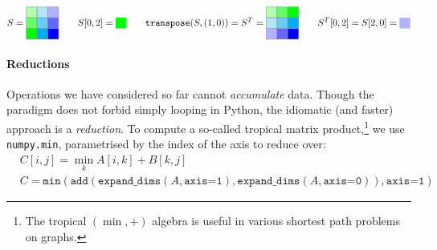 $$
S = \begin{tikzpicture}[baseline=-0.65ex]
    \draw [draw=gray, fill=green] (-0.6, -0.6) rectangle (-0.2, -0.2);
    \draw [draw=gray, fill=green!60] (-0.6, -0.2) rectangle (-0.2, 0.2);
    \draw [draw=gray, fill=green!30] (-0.6, 0.2) rectangle (-0.2, 0.6);
    \draw [draw=gray, fill=cyan] (-0.2, -0.6) rectangle (0.2, -0.2);
    \draw [draw=gray, fill=cyan!60] (-0.2, -0.2) rectangle (0.2, 0.2);
    \draw [draw=gray, fill=cyan!30] (-0.2, 0.2) rectangle (0.2, 0.6);
    \draw [draw=gray, fill=blue] (0.2, -0.6) rectangle (0.6, -0.2);
    \draw [draw=gray, fill=blue!60] (0.2, -0.2) rectangle (0.6, 0.2);
    \draw [draw=gray, fill=blue!30] (0.2, 0.2) rectangle (0.6, 0.6);
\end{tikzpicture} \qquad
S[0, 2] = \begin{tikzpicture}[baseline=-0.65ex]
    \draw [draw=none, fill=green] (-0.2, -0.2) rectangle (0.2, 0.2);
\end{tikzpicture} \qquad 
\texttt{transpose} \left(S, (1, 0) \right)
= S^T = 
\begin{tikzpicture}[baseline=-0.65ex]
    \draw [draw=gray, fill=blue!30] (-0.2, -0.2) rectangle (-0.6, -0.6);
    \draw [draw=gray, fill=cyan!30] (-0.2, 0.2) rectangle (-0.6, -0.2);
    \draw [draw=gray, fill=green!30] (-0.2, 0.6) rectangle (-0.6, 0.2);
    \draw [draw=gray, fill=blue!60] (0.2, -0.2) rectangle (-0.2, -0.6);
    \draw [draw=gray, fill=cyan!60] (0.2, 0.2) rectangle (-0.2, -0.2);
    \draw [draw=gray, fill=green!60] (0.2, 0.6) rectangle (-0.2, 0.2);
    \draw [draw=gray, fill=blue] (0.6, -0.2) rectangle (0.2, -0.6);
    \draw [draw=gray, fill=cyan] (0.6, 0.2) rectangle (0.2, -0.2);
    \draw [draw=gray, fill=green] (0.6, 0.6) rectangle (0.2, 0.2);
\end{tikzpicture} \qquad
S^T[0, 2] = S[2, 0] = \begin{tikzpicture}[baseline=-0.65ex]
\draw [draw=none, fill=blue!30] (-0.2, -0.2) rectangle (0.2, 0.2);
\end{tikzpicture}
$$

\needspace{3em}
\paragraph{Reductions}
Operations we have considered so far cannot \textit{accumulate} data. Though the paradigm does not forbid simply looping in Python, the idiomatic (and faster) approach is a \textit{reduction}. To compute a so-called tropical matrix product,\footnote{The tropical $(\min, +)$ algebra is useful in various shortest path problems on graphs.} we use \texttt{numpy.min}, parametrised by the index of the axis to reduce over:
\begin{align*}
&C[i, j] = \min_k A[i, k] + B[k, j] \\
&C = \texttt{min} \left( \texttt{add} \left(\texttt{expand\_dims}(A, \texttt{axis=1}), \texttt{expand\_dims}(A, \texttt{axis=0}) \right), \texttt{axis=1} \right)
\end{align*}

